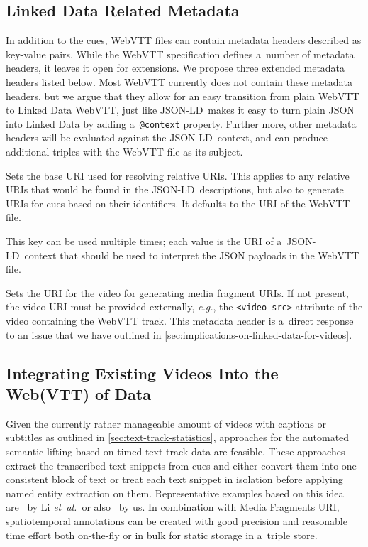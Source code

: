 \documentclass{sig-alternate}
\def\JSONLD{\mbox{JSON-LD}}
\begin{document}
\subsection{Linked Data Related Metadata}

In addition to the cues, WebVTT files can contain
metadata headers described as key-value pairs.
While the WebVTT specification defines a~number of metadata headers,
it leaves it open for extensions.
We propose three extended metadata headers listed below.
Most WebVTT currently does not contain
these metadata headers,
but we argue that they allow for an easy transition
from plain WebVTT to Linked Data WebVTT,
just like \JSONLD\ makes it easy to turn plain JSON into Linked Data
by adding a~\texttt{@context} property.
Further more, other metadata headers will be evaluated
against the \JSONLD\ context,
and can produce additional triples with the WebVTT file as its subject.

\begin{description}[leftmargin=*]
  \item[@base]
  Sets the base URI used for resolving relative URIs.
  This applies to any relative URIs that would be found in the \JSONLD\ descriptions,
  but also to generate URIs for cues based on their identifiers.
  It defaults to the URI of the WebVTT file.
  \item[@context]
  This key can be used multiple times; each value is the URI
  of a~\JSONLD\ context that should be used to
  interpret the JSON payloads in the WebVTT file.
  \item[@video]
  Sets the URI for the video for generating media fragment URIs.
  If not present, the video URI must be provided externally,
  \emph{e.g.}, the \texttt{<video src>} attribute of the video
  containing the WebVTT track.
  This metadata header is a~direct response to an issue that we
  have outlined in \autoref{sec:implications-on-linked-data-for-videos}.
\end{description}

\subsection{Integrating Existing Videos Into the\\ Web(VTT) of Data}
\label{sec:integrating-existing-videos-into-the-web(vtt)-of-data}

Given the currently rather manageable amount of videos
with captions or subtitles as outlined in \autoref{sec:text-track-statistics},
approaches for the automated semantic lifting
based on timed text track data are feasible. 
These approaches extract the transcribed text snippets from cues
and either convert them into one consistent block of text
or treat each text snippet in isolation
before applying named entity extraction on them.
Representative examples based on this idea
are~\cite{li2013enriching,li2012creating,yi2012synote}
by Li \emph{et~al.}\ or also~\cite{steiner2010semwebvid} by us.
In combination with Media Fragments URI, spatiotemporal annotations
can be created with good precision and reasonable time effort
both on-the-fly or in bulk for static storage in a~triple store.
\end{document}
